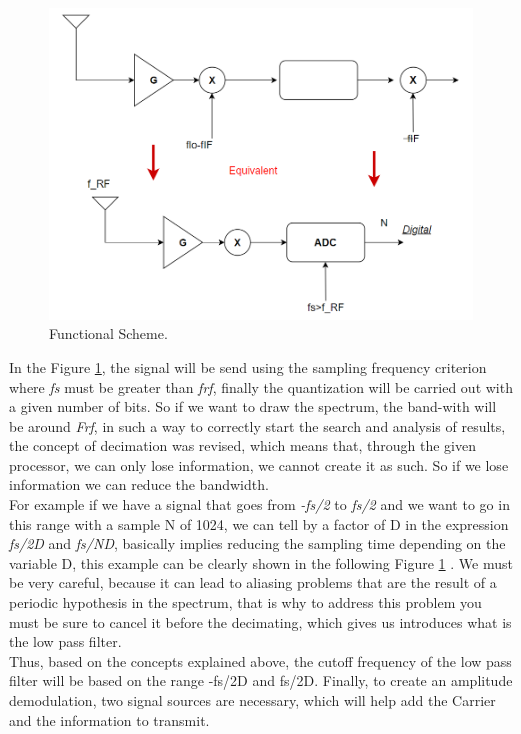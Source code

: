 \documentclass[12pt, twoside]{report}
\begin{document}
\begin{figure}[!h]
\centering
  \includegraphics[width=\linewidth]{images/scheme1.png}
  \caption{Functional Scheme.}
  \label{fig:scheme1}
\end{figure}
In the  Figure \ref{fig:scheme1}, the signal will be send using the sampling frequency criterion where \textit{fs} must be greater than \textit{frf}, finally the quantization will be carried out with a given number of bits.
So if we want to draw the spectrum, the band-with will be around \textit{Frf}, in such a way to correctly start the search and analysis of results, the concept of decimation was revised, which means that, through the given processor, we can only lose information, we cannot create it as such. So if we lose information we can reduce the bandwidth.\\ 
For example if we have a signal that goes from \textit{-fs/2} to \textit{fs/2} and we want to go in this range with a sample N of 1024, we can tell by a factor of D in the expression \textit{fs/2D} and \textit{fs/ND}, basically implies reducing the sampling time depending on the variable D, this example can be clearly shown in the following Figure \ref{fig:scheme1} . We must be very careful, because it can lead to aliasing problems that are the result of a periodic hypothesis in the spectrum, that is why to address this problem you must be sure to cancel it before the decimating, which gives us introduces what is the low pass filter.\\
Thus, based on the concepts explained above, the cutoff frequency of the low pass filter will be based on the range -fs/2D and fs/2D. Finally, to create an amplitude demodulation, two signal sources are necessary, which will help add the Carrier and the information to transmit.
\end{document}
